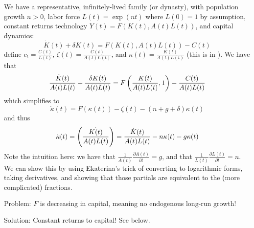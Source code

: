 \documentclass[10pt]{article}
\begin{document}
\begin{model}
	 We have a representative, infinitely-lived family (or dynasty), with population growth $n > 0$, labor force $L(t) = \exp(nt)$ where $L(0) =1$ by assumption, constant returns technology $Y(t) = F(K(t),A(t)L(t))$, and capital dynamics: \[\dot{K}(t) + \delta K(t) = F(K(t),A(t)L(t)) - C(t)\]define $c_t = \frac{C(t)}{L(t)}$, $\zeta(t) = \frac{C(t)}{A(t)L(t)}$, and $\kappa(t) = \frac{K(t)}{A(t)L(t)}$ (this is in ). We have that \[\frac{\dot{K}(t)}{A(t)L(t)} + \frac{\delta K(t)}{A(t)L(t)} = F\left( \frac{K(t)}{A(t)L(t)},1\right) - \frac{C(t)}{A(t)L(t)}\]which simplifies to \[\dot{\kappa}(t) = F(\kappa(t)) - \zeta(t) - (n + g + \delta)\kappa(t)\]and thus \[\dot{\kappa}(t) =\left( \dot{\frac{K(t)}{A(t)L(t)}}\right) = \frac{\dot{K}(t)}{A(t)L(t)} - n\kappa(t) - g\kappa(t)\]
	Note the intuition here: we have that $\frac{1}{A(t)} \frac{\partial A(t)}{\partial t} = g$, and that $\frac{1}{L(t)} \frac{\partial L(t)}{\partial t} = n$. We can show this by using Ekaterina's trick of converting to logarithmic forms, taking derivatives, and showing that those partials are equivalent to the (more complicated) fractions.
	
	Problem: $F$ is decreasing in capital, meaning no endogenous long-run growth!
	
	Solution: Constant returns to capital! See below.
\end{model}
\end{document}
